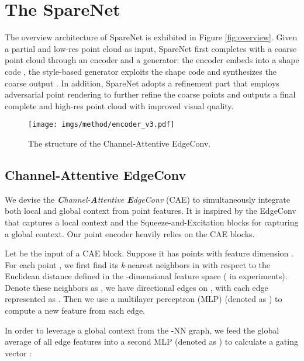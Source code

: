 \documentclass[final]{cvpr}
\begin{document}
\section{The SpareNet}

The overview architecture of SpareNet is exhibited in Figure \ref{fig:overview}. Given a partial and low-res point cloud  as input, SpareNet first completes  with a coarse point cloud  through an encoder and a generator: the encoder  embeds  into a shape code , the style-based generator  exploits the shape code  and synthesizes the coarse output . In addition, SpareNet adopts a refinement part that employs adversarial point rendering to further refine the coarse points  and outputs a final complete and high-res point cloud  with improved visual quality.







\begin{figure}[t]
\centering
\texttt{[image: imgs/method/encoder\_v3.pdf]}
 \footnotesize
    \caption{The structure of the Channel-Attentive EdgeConv.}
\label{fig:encoder}
\vspace{-1em}
\end{figure}

\subsection{Channel-Attentive EdgeConv}
\label{ssec:edgeconv}

We devise the \emph{\textbf{C}hannel-\textbf{A}ttentive \textbf{E}dgeConv} (CAE) to simultaneously integrate both local and global context from point features. It is inspired by the EdgeConv \cite{dgcnn} that captures a local context and the Squeeze-and-Excitation blocks \cite{hu2018senet} for capturing a global context. Our point encoder  heavily relies on the CAE blocks. 


Let  be the input of a CAE block. Suppose it has  points with feature dimension . 
For each point , we first find its \emph{k}-nearest neighbors in  with respect to the Euclidean distance defined in the -dimensional feature space ( in experiments). 
Denote these neighbors as , we have  directional edges on , with each edge represented as . Then we use a multilayer perceptron (MLP) (denoted as ) to compute a new feature  from each edge.

In order to leverage a global context from the -NN graph, we feed the global average of all edge features  into a second MLP (denoted as ) to calculate a gating vector :
\vspace{-0.5em}
\end{document}
